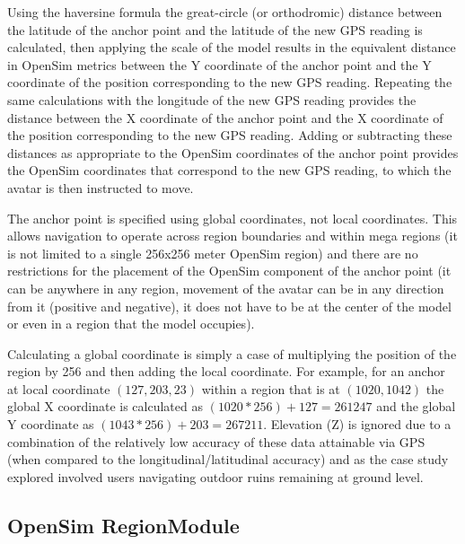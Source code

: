 Using the haversine formula the great-circle (or orthodromic) distance between the latitude of the anchor point and the latitude of the new GPS reading is calculated, then applying the scale of the model results in the equivalent distance in OpenSim metrics between the Y coordinate of the anchor point and the Y coordinate of the position corresponding to the new GPS reading. Repeating the same calculations with the longitude of the new GPS reading provides the distance between the X coordinate of the anchor point and the X coordinate of the position corresponding to the new GPS reading. Adding or subtracting these distances as appropriate to the OpenSim coordinates of the anchor point provides the OpenSim coordinates that correspond to the new GPS reading, to which the avatar is then instructed to move.

The anchor point is specified using global coordinates, not local coordinates. This allows navigation to operate across region boundaries and within mega regions (it is not limited to a single 256x256 meter OpenSim region) and there are no restrictions for the placement of the OpenSim component of the anchor point (it can be anywhere in any region, movement of the avatar can be in any direction from it (positive and negative), it does not have to be at the center of the model or even in a region that the model occupies).

Calculating a global coordinate is simply a case of multiplying the position of the region by 256 and then adding the local coordinate. For example, for an anchor at local coordinate $(127,203,23)$ within a region that is at $(1020,1042)$ the global X coordinate is calculated as $(1020 * 256) + 127 = 261247$ and the global Y coordinate as $(1043 * 256) + 203 = 267211$. Elevation (Z) is ignored due to a combination of the relatively low accuracy of these data attainable via GPS (when compared to the longitudinal/latitudinal accuracy) and as the case study explored involved users navigating outdoor ruins remaining at ground level.


\subsection{OpenSim RegionModule}



